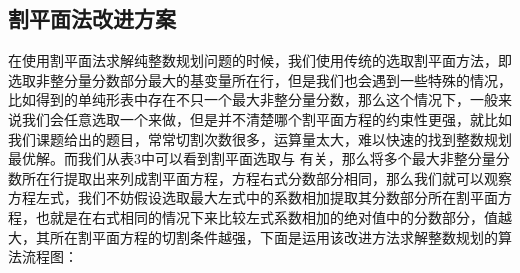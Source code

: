 \subsection{割平面法改进方案}

在使用割平面法求解纯整数规划问题的时候，我们使用传统的选取割平面方法，即选取非整分量分数部分最大的基变量所在行，但是我们也会遇到一些特殊的情况，比如得到的单纯形表中存在不只一个最大非整分量分数，那么这个情况下，一般来说我们会任意选取一个来做，但是并不清楚哪个割平面方程的约束性更强，就比如我们课题给出的题目，常常切割次数很多，运算量太大，难以快速的找到整数规划最优解。而我们从表3中可以看到割平面选取与 有关，那么将多个最大非整分量分数所在行提取出来列成割平面方程，方程右式分数部分相同，那么我们就可以观察方程左式，我们不妨假设选取最大左式中的系数相加提取其分数部分所在割平面方程，也就是在右式相同的情况下来比较左式系数相加的绝对值中的分数部分，值越大，其所在割平面方程的切割条件越强，下面是运用该改进方法求解整数规划的算法流程图：



